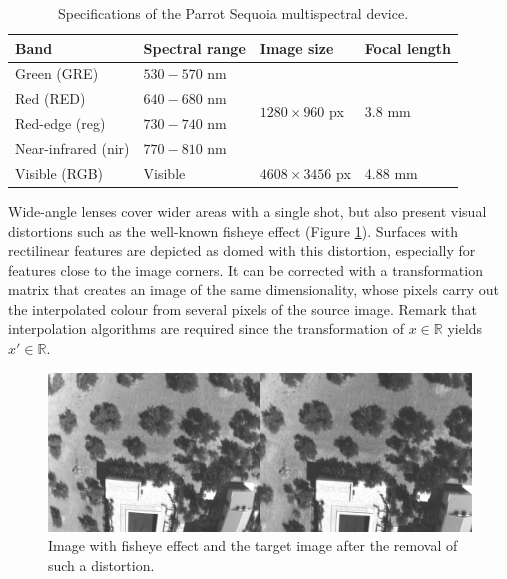 \renewcommand{\arraystretch}{1.2}
\begin{table}[ht]
    \small
    \caption{Specifications of the Parrot Sequoia multispectral device.}
    \label{table:parrot_sequoia}
    \begin{tabular}{llll}
        \toprule
        Band & Spectral range & Image size & Focal length\\
        \midrule
        Green (GRE) & $530-570$ \si{\nano\meter} & \multirow{4}{*}{$1280 \times 960$ px} & \multirow{4}{*}{3.8 \si{\milli\meter}}\\
        Red (RED) & $640-680$ \si{\nano\meter} & & \\
        Red-edge (\acrshort{reg}) & $730-740$ \si{\nano\meter} & & \\
        Near-infrared (\acrshort{nir}) & $770-810$ \si{\nano\meter} & &\\
        \cmidrule{1-4}
        Visible (RGB) & Visible & $4608 \times 3456$ px & 4.88 \si{\milli\meter}\\
        \bottomrule
    \end{tabular}
\end{table}
\renewcommand{\arraystretch}{1}

Wide-angle lenses cover wider areas with a single shot, but also present visual distortions such as the well-known fisheye effect (Figure \ref{fig:fisheye_sample}). Surfaces with rectilinear features are depicted as domed with this distortion, especially for features close to the image corners. It can be corrected with a transformation matrix that creates an image of the same dimensionality, whose pixels carry out the interpolated colour from several pixels of the source image. Remark that interpolation algorithms are required since the transformation of $x \in \mathbb{R}$ yields $x' \in \mathbb{R}$.

\begin{figure}[ht]
	\includegraphics{figs/materials/fisheye_sample.png}
	\caption{Image with fisheye effect and the target image after the removal of such a distortion.}
	\label{fig:fisheye_sample}
\end{figure}

